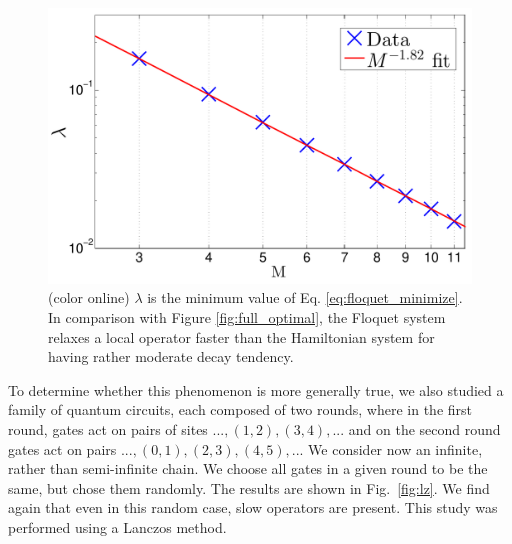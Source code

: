 \documentclass[twocolumn,superscriptaddress, prb]{revtex4-1}
\begin{document}
\begin{figure}
\includegraphics[width=1.0\linewidth]{semi_infinite_floquet_only.pdf}
\centering
\caption{(color online) $\lambda$ is the minimum value of Eq. \eqref{eq:floquet_minimize}. In comparison with Figure \ref{fig:full_optimal}, the Floquet system relaxes a local operator faster than the Hamiltonian system for having rather moderate decay tendency.
}
\label{fig:floquet}
\end{figure}


To determine whether this phenomenon is more generally true, we also studied a family of quantum circuits, each composed of two rounds, where in the first round, gates act on pairs of sites $...,(1,2),(3,4),...$ and on the second round gates act on pairs $...,(0,1),(2,3),(4,5),...$  We consider now an infinite, rather than semi-infinite chain.  We choose all gates in a given round to be the same, but chose them randomly.  The results are shown in Fig.~\ref{fig:lz}.  We find again that even in this random case, slow operators are present.  This study was performed using a Lanczos method.
\end{document}
